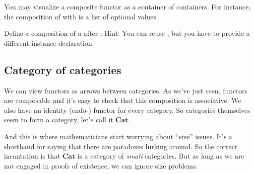 \documentclass[DaoFP]{subfiles}
\begin{document}
You may visualize a composite functor as a container of containers. For instance, the composition of \hask{[]} with  is a list of optional values. 

\begin{exercise}
Define a composition of a  after . Hint: You can reuse , but you have to provide a different instance declaration.
\end{exercise}


\subsection{Category of categories}

We can view functors as arrows between categories. As we've just seen, functors are composable and it's easy to check that this composition is associative. We also have an identity (endo-) functor for every category. So categories themselves seem to form a category, let's call it $\mathbf{Cat}$. 

And this is where mathematicians start worrying about ``size'' issues. It's a shorthand for saying that there are paradoxes lurking around. So the correct incantation is that $\mathbf{Cat}$ is a category of \emph{small} categories. But as long as we are not engaged in proofs of existence, we can ignore size problems.
\end{document}

